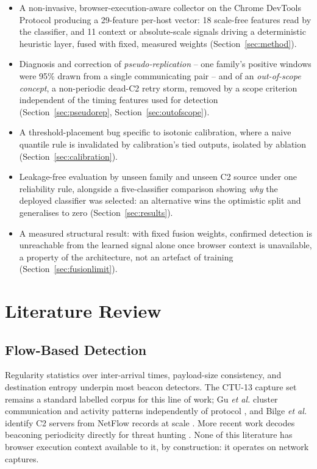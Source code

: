 \documentclass[conference,a4paper]{IEEEtran}
\begin{document}
\begin{itemize}
\item A non-invasive, browser-execution-aware collector on the Chrome DevTools Protocol producing a 29-feature per-host vector: 18 scale-free features read by the classifier, and 11 context or absolute-scale signals driving a deterministic heuristic layer, fused with fixed, measured weights (Section~\ref{sec:method}).
\item Diagnosis and correction of \emph{pseudo-replication} -- one family's positive windows were 95\% drawn from a single communicating pair -- and of an \emph{out-of-scope concept}, a non-periodic dead-C2 retry storm, removed by a scope criterion independent of the timing features used for detection (Section~\ref{sec:pseudorep}, Section~\ref{sec:outofscope}).
\item A threshold-placement bug specific to isotonic calibration, where a naive quantile rule is invalidated by calibration's tied outputs, isolated by ablation (Section~\ref{sec:calibration}).
\item Leakage-free evaluation by unseen family and unseen C2 source under one reliability rule, alongside a five-classifier comparison showing \emph{why} the deployed classifier was selected: an alternative wins the optimistic split and generalises to zero (Section~\ref{sec:results}).
\item A measured structural result: with fixed fusion weights, confirmed detection is unreachable from the learned signal alone once browser context is unavailable, a property of the architecture, not an artefact of training (Section~\ref{sec:fusionlimit}).
\end{itemize}

\section{Literature Review}\label{sec:litreview}

\subsection{Flow-Based Detection}
Regularity statistics over inter-arrival times, payload-size consistency, and destination entropy underpin most beacon detectors. The CTU-13 capture set \cite{garcia2014ctu13} remains a standard labelled corpus for this line of work; Gu \emph{et al.} cluster communication and activity patterns independently of protocol \cite{gu2008botminer}, and Bilge \emph{et al.} identify C2 servers from NetFlow records at scale \cite{bilge2012disclosure}. More recent work decodes beaconing periodicity directly for threat hunting \cite{mahboubi2025lurking}. None of this literature has browser execution context available to it, by construction: it operates on network captures.
\end{document}
